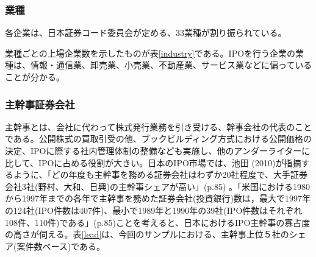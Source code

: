 \documentclass{jsarticle}
\begin{document}
\subsubsection{業種}
各企業は、日本証券コード委員会が定める、33業種が割り振られている。\par
業種ごとの上場企業数を示したものが表\ref{industry}である。IPOを行う企業の業種は、情報・通信業、卸売業、小売業、不動産業、サービス業などに偏っていることが分かる。

\subsubsection{主幹事証券会社}
主幹事とは、会社に代わって株式発行業務を引き受ける、幹事会社の代表のことである。公開株式の買取引受の他、ブックビルディング方式における公開価格の決定、IPOに際する社内管理体制の整備なども実施し、他のアンダーライターに比して、IPOに占める役割が大きい。日本のIPO市場では、池田 (2010)\cite{ikeda2}が指摘するように、「どの年度も主幹事を務める証券会社はわずか20社程度で、大手証券会社3社(野村、大和、日興)の主幹事シェアが高い」(p.85) 。「米国における1980から1997年までの各年で主幹事を務めた証券会社(投資銀行)数は，最大で1997年の124社(IPO件数は407件)、最小で1989年と1990年の39社(IPO件数はそれぞれ108件、110件)である」(p.85)ことを考えると、日本におけるIPO主幹事の寡占度の高さが伺える。表\ref{lead}は、今回のサンプルにおける、主幹事上位５社のシェア(案件数ベース)である。\par
\end{document}
